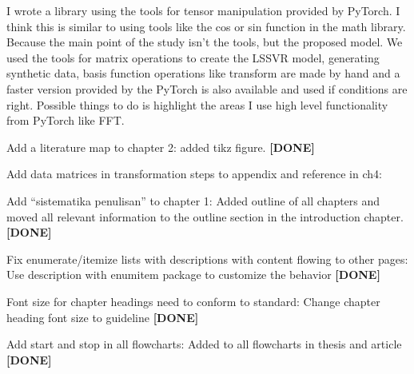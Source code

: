\documentclass[a4paper,12pt]{scrreprt}
\begin{document}
\begin{numdesc}
    I wrote a library using the tools for tensor manipulation provided by PyTorch. I think this is similar to using tools like the cos or sin function in the math library. Because the main point of the study isn't the tools, but the proposed model. We used the tools for matrix operations to create the LSSVR model, generating synthetic data, basis function operations like transform are made by hand and a faster version provided by the PyTorch is also available and used if conditions are right. Possible things to do is highlight the areas I use high level functionality from PyTorch like FFT\@.
    \item[Add a literature map to chapter 2:] added tikz figure. \textbf{[DONE]}
    \item[Add data matrices in transformation steps to appendix and reference in ch4:]
    \item[Add \enquote{sistematika penulisan} to chapter 1:] Added outline of all chapters and moved all relevant information to the outline section in the introduction chapter. \textbf{[DONE]}
    \item[Fix enumerate/itemize lists with descriptions with content flowing to other pages:] Use description with enumitem package to customize the behavior \textbf{[DONE]}
    \item[Font size for chapter headings need to conform to standard:] Change chapter heading font size to guideline \textbf{[DONE]}
    \item[Add start and stop in all flowcharts:] Added to all flowcharts in thesis and article \textbf{[DONE]}
\end{numdesc}
\end{document}
